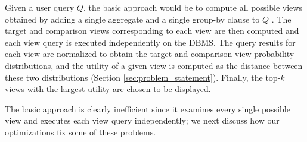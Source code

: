 Given a user query $Q$, the basic approach would be to compute all
possible views obtained by adding a single aggregate and a single group-by
clause to $Q$ . 
The target and comparison views corresponding to each view are then
computed and each view query is executed independently on the DBMS. The query
results for each view are normalized to obtain the target and comparison view
probability distributions, and the utility of a given view is computed as the
distance between these two distributions (Section \ref{sec:problem_statement}).
Finally, the top-$k$ views with the largest utility are chosen to be displayed. 

The basic approach is clearly inefficient
since it examines every single possible view 
and executes each view query independently;
we next discuss how our optimizations fix some of these problems.


